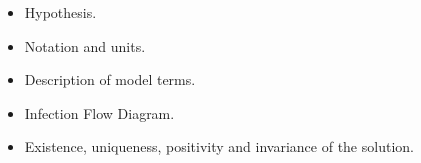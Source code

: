 
\begin{itemize}
	\item	
    	Hypothesis.
    \item 
    	Notation and units.
    \item
    	Description of model terms.
    \item
    	Infection Flow Diagram.
    \item 
    	Existence, uniqueness, positivity and invariance of the
        solution.
\end{itemize}